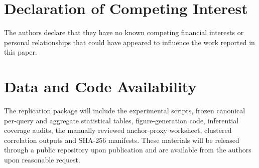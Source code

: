 \documentclass[a4paper,fleqn]{cas-dc}
\begin{document}
\section*{Declaration of Competing Interest}

The authors declare that they have no known competing financial interests or personal relationships that could have appeared to influence the work reported in this paper.

\section*{Data and Code Availability}

The replication package will include the experimental scripts, frozen canonical per-query and aggregate statistical tables, figure-generation code, inferential coverage audits, the manually reviewed anchor-proxy worksheet, clustered correlation outputs and SHA-256 manifests. These materials will be released through a public repository upon publication and are available from the authors upon reasonable request.

\printcredits



\end{document}
